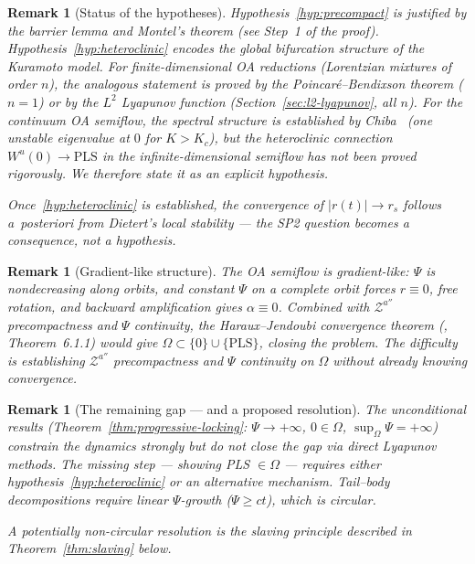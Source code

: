 \documentclass[11pt,a4paper]{article}
\newtheorem{remark}[theorem]{Remark}
\theoremstyle{definition}
\begin{document}
\begin{remark}[Status of the hypotheses]\label{rem:hypotheses}
Hypothesis~\ref{hyp:precompact} is justified by the barrier lemma and Montel's theorem (see Step~1 of the proof). Hypothesis~\ref{hyp:heteroclinic} encodes the global bifurcation structure of the Kuramoto model. For \emph{finite-dimensional} OA reductions (Lorentzian mixtures of order $n$), the analogous statement is proved by the Poincar\'e--Bendixson theorem ($n=1$) or by the $L^2$ Lyapunov function (Section~\ref{sec:l2-lyapunov}, all $n$). For the \emph{continuum} OA semiflow, the spectral structure is established by Chiba~\cite{chiba2015} (one unstable eigenvalue at $0$ for $K > K_c$), but the heteroclinic connection $W^u(0) \to \mathrm{PLS}$ in the infinite-dimensional semiflow has not been proved rigorously. We therefore state it as an explicit hypothesis.

Once~\ref{hyp:heteroclinic} is established, the convergence of $|r(t)| \to r_s$ follows \emph{a~posteriori} from Dietert's local stability --- the SP2 question becomes a consequence, not a hypothesis.
\end{remark}

\begin{remark}[Gradient-like structure]\label{rem:gradient-like}
The OA semiflow is \emph{gradient-like}: $\Psi$ is nondecreasing along orbits, and constant $\Psi$ on a complete orbit forces $r \equiv 0$, free rotation, and backward amplification gives $\alpha \equiv 0$. Combined with $\mathcal{Z}^{a''}$ precompactness and $\Psi$ continuity, the Haraux--Jendoubi convergence theorem (\cite{haraux-jendoubi2015}, Theorem~6.1.1) would give $\Omega \subset \{0\} \cup \{\mathrm{PLS}\}$, closing the problem. The difficulty is establishing $\mathcal{Z}^{a''}$ precompactness and $\Psi$ continuity on $\Omega$ without already knowing convergence.
\end{remark}

\begin{remark}[The remaining gap --- and a proposed resolution]
The unconditional results (Theorem~\ref{thm:progressive-locking}: $\Psi \to +\infty$, $0 \in \Omega$, $\sup_\Omega\Psi = +\infty$) constrain the dynamics strongly but do not close the gap via direct Lyapunov methods. The missing step --- showing PLS $\in \Omega$ --- requires either hypothesis~\ref{hyp:heteroclinic} or an alternative mechanism. Tail--body decompositions require linear $\Psi$-growth ($\Psi \geq ct$), which is circular.

A potentially non-circular resolution is the \emph{slaving principle} described in Theorem~\ref{thm:slaving} below.
\end{remark}
\end{document}
